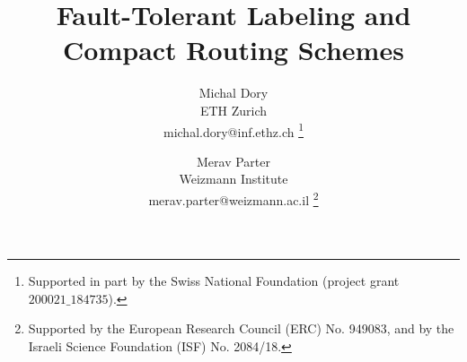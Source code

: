 \documentclass[11pt]{article}
\begin{document}
\date{}

\title{Fault-Tolerant Labeling and Compact Routing Schemes}
\author{
 Michal Dory\\
  \small ETH Zurich\\
  \small michal.dory@inf.ethz.ch
  			\thanks{Supported in part by the Swiss National Foundation (project grant $200021\_184735$).} 
\and
Merav Parter\\
        \small Weizmann Institute \\
        \small merav.parter@weizmann.ac.il 
			\thanks{Supported by the European Research Council (ERC) No. 949083, and by the Israeli Science Foundation (ISF) No. 2084/18.}
}
\maketitle



\tableofcontents

\newpage













 






\appendix



\end{document}
